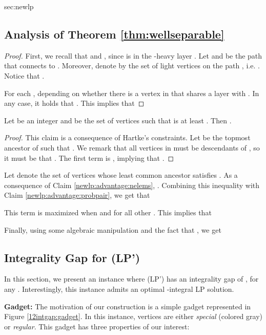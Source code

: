 \begin{appendixextra}{sec:newlp}{\subsection{Analysis of Theorem \ref{thm:wellseparable}}}
\begin{claim}
\end{claim}

\begin{proof}
First, we recall that  and , since  is in the -heavy layer .  
Let  and  be the path that connects  to .
Moreover, denote by  the set of light vertices on the path , i.e. .   
Notice that .  

For each ,  depending on whether there is a vertex  in  that shares a layer with . 
In any case, it holds that .
This implies that 

\end{proof} 

\begin{claim} 
\label{newlp:advantage:nelems}
Let  be an integer and  be the set of vertices  such that  is at least . Then .
\end{claim} 

\begin{proof} 
This claim is a consequence of Hartke's constraints.
Let  be the topmost ancestor of  such that . 
We remark that all vertices in  must be descendants of , so it must be that . 
The first term is , implying that .
\end{proof} 

Let  denote the set of vertices  whose least common ancestor  satisfies .
As a consequence of Claim \ref{newlp:advantage:nelems}, .  
Combining this inequality with Claim \ref{newlp:advantage:probpair}, we get that


This term is maximized when  and  for all other . 
This implies that 


Finally, using some algebraic manipulation and the fact that , we get  


\end{appendixextra}


\subsection{Integrality Gap for (LP')}
\label{sec:gap-newlp}  
In this section, we present an instance where (LP') has an integrality gap of
, for any .
Interestingly, this instance admits an optimal -integral LP solution.  

{\bf Gadget:}
The motivation of our construction is a simple gadget represented in
Figure \ref{12intgap:gadget}. 
In this instance, vertices are either {\em special} (colored gray) or {\em regular}. 
This gadget has three properties of our interest: 

